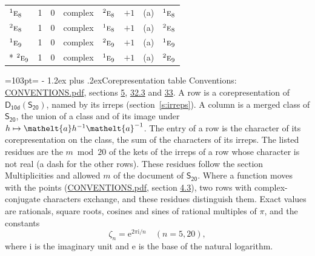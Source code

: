 \documentclass[10pt,a4paper]{article}
\makeatletter
\renewcommand\section{\@startsection{section}{1}{\z@}{-3ex plus -1ex minus -.2ex}%
  {1.2ex plus .2ex}{\normalfont\large\sffamily\bfseries\color{parttitle}}}
\newcommand{\needspace}[1]{\par\penalty-100\begingroup\dimen0=#1\relax\dimen2=\pagegoal
  \advance\dimen2-\pagetotal\ifdim\dimen0>\dimen2\relax\ifdim\dimen2>0pt\vfil\break\fi\fi
  \endgroup}
\numberwithin{equation}{section}
\newcommand{\eltfont}[1]{{\let\sigma\eltsigma\mathelt{#1}}}
\newcommand{\grp}[1]{\mathsf{#1}}
\newcommand{\irr}[1]{\text{\normalfont\scshape #1}}
\newcommand{\conjpair}[1]{{}^{#1}}
\newcommand{\elt}[1]{\eltfont{#1}}
\newcommand{\iunit}{\mathrm{i}}
\newcommand{\expe}{\mathrm{e}}
\newcommand{\rootunity}[1]{\zeta_{#1}}
\makeatother
\begin{document}
{\begin{longtable}{@{}lrrllrll@{}}
$\conjpair{1}\irr{e}_{8}$ & 1 & $0$ & complex & $\conjpair{2}\irr{e}_{8}$ & $+1$ & (a) & $\conjpair{1}\irr{e}_{8}$\\
$\conjpair{2}\irr{e}_{8}$ & 1 & $0$ & complex & $\conjpair{1}\irr{e}_{8}$ & $+1$ & (a) & $\conjpair{2}\irr{e}_{8}$\\
$\conjpair{1}\irr{e}_{9}$ & 1 & $0$ & complex & $\conjpair{2}\irr{e}_{9}$ & $+1$ & (a) & $\conjpair{1}\irr{e}_{9}$\\*
$\conjpair{2}\irr{e}_{9}$ & 1 & $0$ & complex & $\conjpair{1}\irr{e}_{9}$ & $+1$ & (a) & $\conjpair{2}\irr{e}_{9}$\\
\bottomrule\end{longtable}}
\needspace{103pt}
\section{Corepresentation table}\label{s:character_table}
Conventions: \href{../../CONVENTIONS.pdf}{CONVENTIONS.pdf}, sections \href{../../../rotation/CONVENTIONS.pdf\#conv.5}{5}, \href{../../CONVENTIONS.pdf\#conv.32.3}{32.3} and \href{../../CONVENTIONS.pdf\#conv.33}{33}.
A row is a corepresentation of $\grp{D_{10d}}(\grp{S_{20}})$, named by its irreps (section~\ref{s:irreps}). A column is a merged class of $\grp{S_{20}}$, the union of a class and of its image under $h \mapsto \elt{a} h^{-1} \elt{a}^{-1}$. The entry of a row is the character of its corepresentation on the class, the sum of the characters of its irreps.
\leavevmode\label{n:head.parity}The listed residues are the $m \bmod 20$ of the kets of the irreps of a row whose character is not real (a dash for the other rows). These residues follow the section Multiplicities and allowed $m$ of the document of \href{../../../rotation/data/pdf/S20.pdf}{$\grp{S_{20}}$}. Where a function moves with the points (\href{../../CONVENTIONS.pdf}{CONVENTIONS.pdf}, section \href{../../../rotation/CONVENTIONS.pdf\#conv.4.3}{4.3}), two rows with complex-conjugate characters exchange, and these residues distinguish them.
\leavevmode\label{n:constant.root}\label{n:index.root.order}Exact values are rationals, square roots, cosines and sines of rational multiples of $\pi$, and the constants
\begin{equation}\label{e:constants}\rootunity{n} = \expe^{2\pi\iunit/n}\quad(n = 5, 20),\end{equation}
where $\iunit$ is the imaginary unit and $\expe$ is the base of the natural logarithm.
\end{document}
